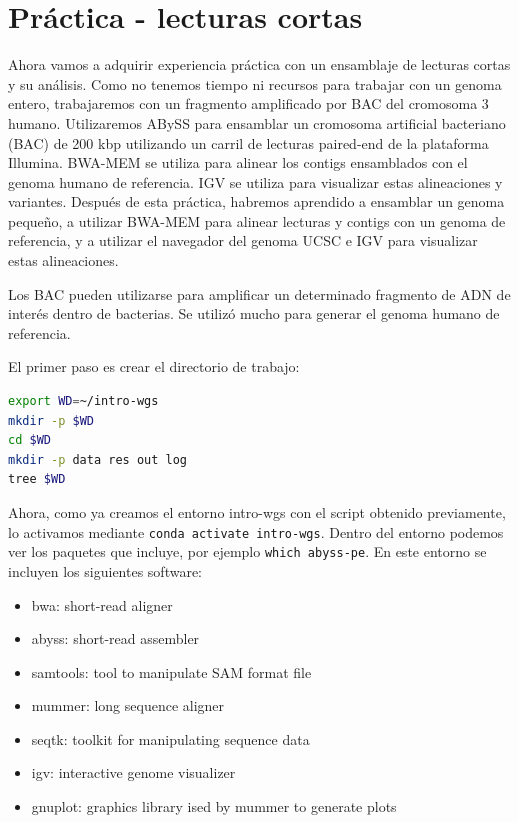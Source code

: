 \section{Práctica - lecturas cortas}
Ahora vamos a adquirir experiencia práctica con un ensamblaje de lecturas cortas y su análisis.
Como no tenemos tiempo ni recursos para trabajar con un genoma entero, trabajaremos con un fragmento amplificado por BAC del cromosoma 3 humano.
Utilizaremos ABySS para ensamblar un cromosoma artificial bacteriano (BAC) de 200 kbp utilizando un carril de lecturas paired-end de la plataforma Illumina. BWA-MEM se utiliza para alinear los contigs ensamblados con el genoma humano de referencia. IGV se utiliza para visualizar estas alineaciones y variantes.
Después de esta práctica, habremos aprendido a ensamblar un genoma pequeño, a utilizar BWA-MEM para alinear lecturas y contigs con un genoma de referencia, y a utilizar el navegador del genoma UCSC e IGV para visualizar estas alineaciones.

Los BAC pueden utilizarse para amplificar un determinado fragmento de ADN de interés dentro de bacterias. Se utilizó mucho para generar el genoma humano de referencia.

El primer paso es crear el directorio de trabajo:
\begin{lstlisting}[language=bash]
export WD=~/intro-wgs 
mkdir -p $WD
cd $WD
mkdir -p data res out log 
tree $WD
\end{lstlisting}

Ahora, como ya creamos el entorno intro-wgs con el script obtenido previamente, lo activamos mediante \texttt{conda activate intro-wgs}. Dentro del entorno podemos ver los paquetes que incluye, por ejemplo \texttt{which abyss-pe}. En este entorno se incluyen los siguientes software:
\begin{itemize}
\item bwa: short-read aligner
\item abyss: short-read assembler
\item samtools: tool to manipulate SAM format file
\item mummer: long sequence aligner
\item seqtk: toolkit for manipulating sequence data
\item igv: interactive genome visualizer
\item gnuplot: graphics library ised by mummer to generate plots
\end{itemize}

